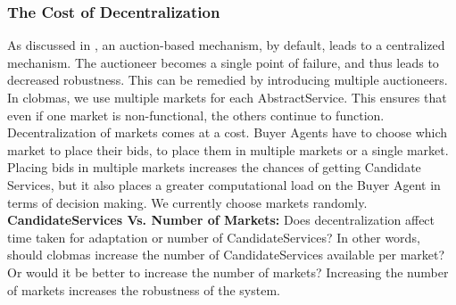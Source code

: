 \documentclass[10pt,journal,compsoc]{IEEEtran}
\begin{document}
\subsubsection{The Cost of Decentralization}
As discussed in \cite{Eymann2003Decentralized}, an auction-based mechanism, by default, leads to a centralized mechanism. The auctioneer becomes a single point of failure, and thus leads to decreased robustness. This can be remedied by introducing multiple auctioneers. In clobmas, we use multiple markets for each AbstractService. This ensures that even if one market is non-functional, the others continue to function. Decentralization of markets comes at a cost. Buyer Agents have to choose which market to place their bids, to place them in multiple markets or a single market. Placing bids in multiple markets increases the chances of getting Candidate Services, but it also places a greater computational load on the Buyer Agent in terms of decision making. We currently choose markets randomly.\\
\textbf{CandidateServices Vs. Number of Markets:} Does decentralization affect time taken for adaptation or number of CandidateServices? In other words, should clobmas increase the number of CandidateServices available per market? Or would it be better to increase the number of markets? Increasing the number of markets increases the robustness of the system. 
\end{document}
